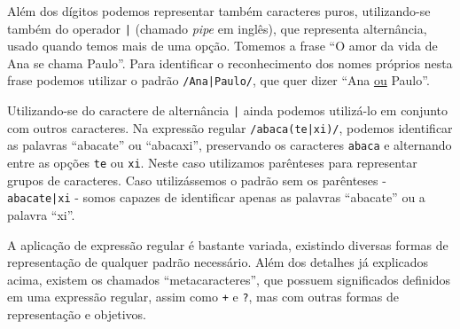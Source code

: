 Além dos dígitos podemos representar também caracteres puros, utilizando-se também do operador \texttt{|} (chamado \emph{pipe} em inglês), que representa alternância, usado quando temos mais de uma opção. Tomemos a frase ``O amor da vida de Ana se chama Paulo''. Para identificar o reconhecimento dos nomes próprios nesta frase podemos utilizar o padrão \texttt{/Ana|Paulo/}, que quer dizer ``Ana \underline{ou} Paulo''.

Utilizando-se do caractere de alternância \texttt{|} ainda podemos utilizá-lo em conjunto com outros caracteres. Na expressão regular \texttt{/abaca(te|xi)/}, podemos identificar as palavras ``abacate'' ou ``abacaxi'', preservando os caracteres \texttt{abaca} e alternando entre as opções \texttt{te} ou \texttt{xi}. Neste caso utilizamos parênteses para representar grupos de caracteres. Caso utilizássemos o padrão sem os parênteses - \texttt{abacate|xi} - somos capazes de identificar apenas as palavras ``abacate'' ou a palavra ``xi''.

A aplicação de expressão regular é bastante variada, existindo diversas formas de representação de qualquer padrão necessário. Além dos detalhes já explicados acima, existem os chamados ``metacaracteres'', que possuem significados definidos em uma expressão regular, assim como \texttt{+} e \texttt{?}, mas com outras formas de representação e objetivos.

